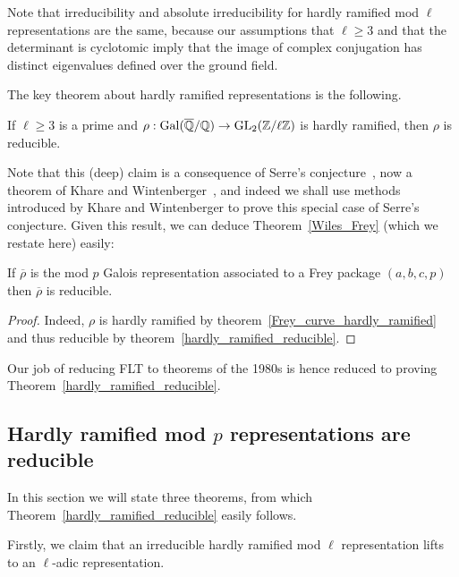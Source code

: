 Note that irreducibility and absolute irreducibility for hardly ramified mod $\ell$ representations
are the same, because our assumptions that $\ell\geq3$
and that the determinant is cyclotomic imply that the image of complex conjugation
has distinct eigenvalues defined over the ground field.

The key theorem about hardly ramified representations is the following.

\begin{theorem}
  \label{hardly_ramified_reducible}
  \leanok
  If $\ell\geq 3$ is a prime and $\rho:\operatorname{Gal}(\overline{\mathbb{Q}}/\mathbb{Q})\to\operatorname{GL}_2(\mathbb{Z}/\ell\mathbb{Z})$ is hardly ramified,
  then $\rho$ is reducible.
\end{theorem}

Note that this (deep) claim is a consequence of Serre's conjecture~\cite{serreconj},
now a theorem of Khare and Wintenberger~\cite{kwII}, and indeed we shall use
methods introduced by Khare and Wintenberger to prove this special case of
Serre's conjecture. Given this result, we can deduce Theorem~\ref{Wiles_Frey}
(which we restate here) easily:

\begin{theorem}
  \label{Wiles_Frey_again}
  \leanok
  If $\overline{\rho}$ is the mod $p$ Galois representation associated to a Frey package $(a,b,c,p)$ then
  $\overline{\rho}$ is reducible.
\end{theorem}
\begin{proof}
  Indeed, $\rho$ is hardly ramified by theorem~\ref{Frey_curve_hardly_ramified}
  and thus reducible by theorem~\ref{hardly_ramified_reducible}.
\end{proof}

Our job of reducing FLT to theorems of the 1980s is hence reduced to proving
Theorem~\ref{hardly_ramified_reducible}.

\subsection{Hardly ramified mod $p$ representations are reducible}

In this section we will state three theorems, from which Theorem~\ref{hardly_ramified_reducible}
easily follows.

Firstly, we claim that
an irreducible hardly ramified mod $\ell$ representation lifts to an $\ell$-adic representation.

